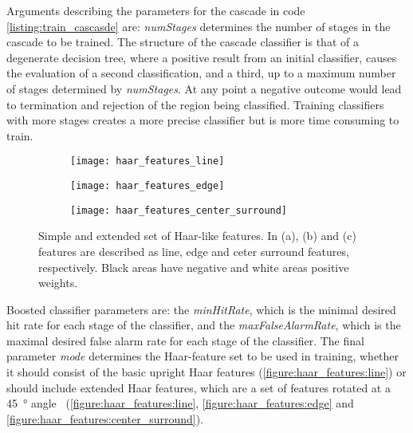 Arguments describing the parameters for the cascade in code \autoref{listing:train_cascasde} are: \emph{numStages} determines the number of stages in the cascade to be trained. The structure of the cascade classifier is that of a degenerate decision tree, where a positive result from an initial classifier, causes the evaluation of a second classification, and a third, up to a maximum number of stages determined by \emph{numStages}. At any point a negative outcome would lead to termination and rejection of the region being classified. Training classifiers with more stages creates a more precise classifier but is more time consuming to train.

\begin{figure}[htbp!]
	\begin{subfigure}[b]{\linewidth}
		\centering
		\texttt{[image: haar\_features\_line]}
		\caption{}
		\label{figure:haar_features:line}
	\end{subfigure}
	\begin{subfigure}[b]{\linewidth}
		\centering
		\texttt{[image: haar\_features\_edge]}
		\caption{}
		\label{figure:haar_features:edge}
	\end{subfigure}
	\begin{subfigure}[b]{\linewidth}
		\centering
		\texttt{[image: haar\_features\_center\_surround]}
		\caption{}
		\label{figure:haar_features:center_surround}
	\end{subfigure}
	\caption[Extended Haar features]{Simple and extended set of Haar-like features. In (a), (b) and (c) features are described as line, edge and ceter surround features, respectively. Black areas have negative and white areas positive weights.}
	\label{figure:haar_features}
\end{figure}

Boosted classifier parameters are: the \emph{minHitRate}, which is the minimal desired hit rate for each stage of the classifier, and the \emph{maxFalseAlarmRate}, which is the maximal desired false alarm rate for each stage of the classifier. The final parameter \emph{mode} determines the Haar-feature set to be used in training, whether it should consist of the basic upright Haar features (\autoref{figure:haar_features:line}) or should include extended Haar features, which are a set of features rotated at a \SI{45}{\degree} angle~\cite{Lienhart2002} (\autoref{figure:haar_features:line}, \autoref{figure:haar_features:edge} and \autoref{figure:haar_features:center_surround}).

